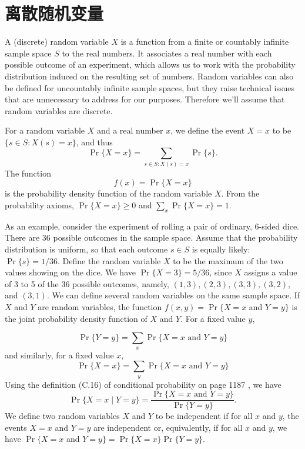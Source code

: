 \documentclass[lang=cn,newtx,10pt,scheme=chinese]{elegantbook}
\begin{document}
\section{离散随机变量}

A (discrete) random variable $X$ is a function from a finite or countably infinite sample space $S$ to the real numbers. It associates a real number with each possible outcome of an experiment, which allows us to work with the probability distribution induced on the resulting set of numbers. Random variables can also be defined for uncountably infinite sample spaces, but they raise technical issues that are unnecessary to address for our purposes. Therefore we'll assume that random variables are discrete.

For a random variable $X$ and a real number $x$, we define the event $X=x$ to be $\{s \in S: X(s)=x\}$, and thus
$$
\operatorname{Pr}\{X=x\}=\sum_{s \in S: X(s)=x} \operatorname{Pr}\{s\} .
$$
The function
$$
f(x)=\operatorname{Pr}\{X=x\}
$$
is the probability density function of the random variable $X$. From the probability axioms, $\operatorname{Pr}\{X=x\} \geq 0$ and $\sum_x \operatorname{Pr}\{X=x\}=1$.

As an example, consider the experiment of rolling a pair of ordinary, 6-sided dice. There are 36 possible outcomes in the sample space. Assume that the probability distribution is uniform, so that each outcome $s \in S$ is equally likely: $\operatorname{Pr}\{s\}=1 / 36$. Define the random variable $X$ to be the maximum of the two values showing on the dice. We have $\operatorname{Pr}\{X=3\}=5 / 36$, since $X$ assigns a value of 3 to 5 of the 36 possible outcomes, namely, $(1,3),(2,3),(3,3),(3,2)$, and $(3,1)$.
We can define several random variables on the same sample space. If $X$ and $Y$ are random variables, the function
$f(x, y)=\operatorname{Pr}\{X=x$ and $Y=y\}$
is the joint probability density function of $X$ and $Y$. For a fixed value $y$,

$$
\operatorname{Pr}\{Y=y\}=\sum_x \operatorname{Pr}\{X=x \text { and } Y=y\}
$$
and similarly, for a fixed value $x$,
$$
\operatorname{Pr}\{X=x\}=\sum_y \operatorname{Pr}\{X=x \text { and } Y=y\}
$$
Using the definition (C.16) of conditional probability on page 1187 , we have
$$
\operatorname{Pr}\{X=x \mid Y=y\}=\frac{\operatorname{Pr}\{X=x \text { and } Y=y\}}{\operatorname{Pr}\{Y=y\}} .
$$
We define two random variables $X$ and $Y$ to be independent if for all $x$ and $y$, the events $X=x$ and $Y=y$ are independent or, equivalently, if for all $x$ and $y$, we have $\operatorname{Pr}\{X=x$ and $Y=y\}=\operatorname{Pr}\{X=x\} \operatorname{Pr}\{Y=y\}$.
\end{document}
